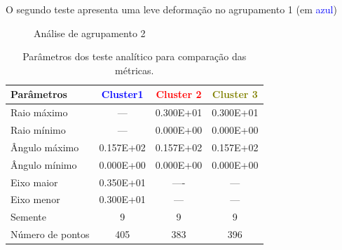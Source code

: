 O segundo teste apresenta uma leve deformação no agrupamento 1 (em \textcolor{blue}{azul})

\begin{figure}[H]
	\centering
	\setlength{\fboxsep}{8pt}
	\setlength{\fboxrule}{0.1pt}
	\caption{Análise de agrupamento 2}
	\label{AC2}
\end{figure}


\begin{table}[H]
	\centering
	\caption{Parâmetros dos teste analítico para comparação das métricas.}
	\label{analise2}
	\begin{tabular}{lccc}
		\hline
		Parâmetros       & \textcolor{blue}{Cluster1} & \textcolor{red}{Cluster 2} & \textcolor{olive}{Cluster 3} \\ \hline
		Raio máximo      & --- & 0.300E+01 & 0.300E+01 \\
		Raio mínimo      & --- & 0.000E+00 & 0.000E+00 \\
		Ângulo máximo    & 0.157E+02 & 0.157E+02 & 0.157E+02 \\
		Ângulo mínimo    & 0.000E+00 & 0.000E+00 & 0.000E+00 \\
		Eixo maior        & 0.350E+01        & ----         & ---         \\
		Eixo menor          & 0.300E+01        & ---       & ---        \\
		Semente          & 9         & 9         & 9         \\
		Número de pontos & 405       & 383       & 396   \\   \hline
	\end{tabular}
\end{table}


